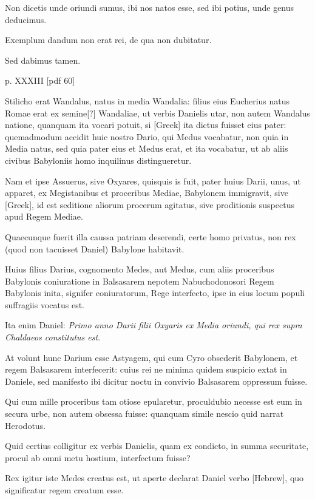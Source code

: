 \begin{parnumbers}
Non dicetis unde oriundi sumus, ibi nos natos
esse, sed ibi potius, unde genus deducimus.

Exemplum dandum
non erat rei, de qua non dubitatur.

Sed dabimus tamen.

\clearpage
p. XXXIII [pdf 60]

Stilicho
erat Wandalus, natus in media Wandalia: filius eius Eucherius natus
Romae erat ex semine[?] Wandaliae, ut verbis Danielis utar, non autem
Wandalus natione, quanquam ita vocari potuit, si \textgreek{[Greek]}
ita dictus fuisset eius pater: quemadmodum accidit huic nostro
Dario, qui Medus vocabatur, non quia in Media natus, sed
quia pater eius et Medus erat, et ita vocabatur, ut ab aliis civibus
Babyloniis homo inquilinus distingueretur.

Nam et ipse Assuerus,
sive Oxyares, quisquis is fuit, pater huius Darii, unus, ut apparet,
ex Megistanibus et proceribus Mediae, Babylonem immigravit,
sive \textgreek{[Greek]}, id est seditione aliorum procerum agitatus,
sive proditionis suspectus apud Regem Mediae.

Quaecunque fuerit
illa caussa patriam deserendi, certe homo privatus, non rex
(quod non tacuisset Daniel) Babylone habitavit.

Huius filius Darius,
cognomento Medes, aut Medus, cum aliis proceribus Babylonis
coniuratione in Balsasarem nepotem Nabuchodonosori Regem
Babylonis inita, signifer coniuratorum, Rege interfecto, ipse
in eius locum populi suffragiis vocatus est.

Ita enim Daniel: \textit{Primo
anno Darii filii Oxyaris ex Media oriundi, qui rex supra Chaldaeos
constitutus est}.

At volunt hunc Darium esse Astyagem, qui cum
Cyro obsederit Babylonem, et regem Balsasarem interfecerit: cuius
rei ne minima quidem suspicio extat in Daniele, sed manifesto
ibi dicitur noctu in convivio Balsasarem oppressum fuisse.

Qui
cum mille proceribus tam otiose epularetur, proculdubio necesse
est eum in secura urbe, non autem obsessa fuisse: quanquam simile
nescio quid narrat Herodotus.

Quid certius colligitur ex verbis
Danielis, quam ex condicto, in summa securitate, procul ab omni
metu hostium, interfectum fuisse?

Rex igitur iste Medes creatus
est, ut aperte declarat Daniel verbo
 \texthebrew{[Hebrew]}, quo significatur regem
creatum esse.


\end{parnumbers}
